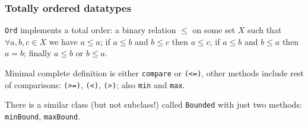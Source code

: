 %

\subsubsection{Totally ordered datatypes}
\texttt{Ord} implements a total order: a binary relation $\le$ on some set $X$ such that $\forall a, b, c \in X$ we have $a \le a$; if $a \le b$ and $b \le c$ then $a \le c$, if $a \le b$ and $b \le a$ then $a = b$; finally $a \le b$ or $b \le a$.

Minimal complete definition is either \texttt{compare} or \texttt{(<=)}, other methods include rest of comparisons: \texttt{(>=)}, \texttt{(<)}, \texttt{(>)}; also \texttt{min} and \texttt{max}.

There is a similar class (but not subclass!) called \texttt{Bounded} with just two methods: \texttt{minBound}, \texttt{maxBound}.

%